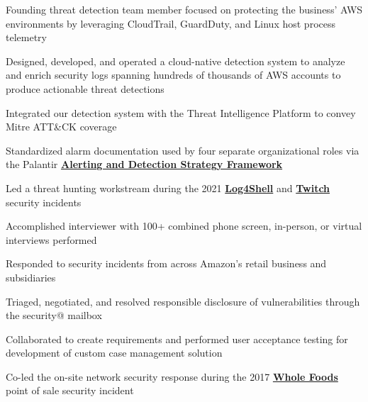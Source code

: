 \documentclass[letterpaper]{deedy-resume} %
\begin{document}
\begin{minipage}[t]{0.66\textwidth}
\begin{tightitemize}
\item Founding threat detection team member focused on protecting the business' AWS environments by leveraging CloudTrail, GuardDuty, and Linux host process telemetry
\item Designed, developed, and operated a cloud-native detection system to analyze and enrich security logs spanning hundreds of thousands of AWS accounts to produce actionable threat detections
\item Integrated our detection system with the Threat Intelligence Platform to convey Mitre ATT\&CK coverage
\item Standardized alarm documentation used by four separate organizational roles via the Palantir \textbf{\href{https://blog.palantir.com/alerting-and-detection-strategy-framework-52dc33722df2}{Alerting and Detection Strategy Framework}}
\item Led a threat hunting workstream during the 2021 \textbf{\href{https://www.cisa.gov/news-events/cybersecurity-advisories/aa21-356a}{Log4Shell}} and \textbf{\href{https://blog.twitch.tv/en/2021/10/15/updates-on-the-twitch-security-incident/}{Twitch}} security incidents
\item Accomplished interviewer with 100+ combined phone screen, in-person, or virtual interviews performed
\end{tightitemize}

\sectionspace %



\begin{tightitemize}
\item Responded to security incidents from across Amazon's retail business and subsidiaries
\item Triaged, negotiated, and resolved responsible disclosure of vulnerabilities through the security@ mailbox
\item Collaborated to create requirements and performed user acceptance testing for development of custom case management solution
\item Co-led the on-site network security response during the 2017 \textbf{\href{https://media.wholefoodsmarket.com/whole-foods-market-payment-card-investigation-update/}{Whole Foods}} point of sale security incident
\end{tightitemize}


\end{minipage}
\end{document}

